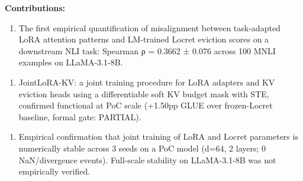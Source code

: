 \textbf{Contributions:}

\begin{enumerate}
\item The first empirical quantification of misalignment between task-adapted LoRA attention patterns and LM-trained Locret eviction scores on a downstream NLI task: Spearman ρ = 0.3662 ± 0.076 across 100 MNLI examples on LLaMA-3.1-8B.
\end{enumerate}

\begin{enumerate}
\item JointLoRA-KV: a joint training procedure for LoRA adapters and KV eviction heads using a differentiable soft KV budget mask with STE, confirmed functional at PoC scale (+1.50pp GLUE over frozen-Locret baseline, formal gate: PARTIAL).
\end{enumerate}

\begin{enumerate}
\item Empirical confirmation that joint training of LoRA and Locret parameters is numerically stable across 3 seeds on a PoC model (d=64, 2 layers; 0 NaN/divergence events). Full-scale stability on LLaMA-3.1-8B was not empirically verified.
\end{enumerate}

